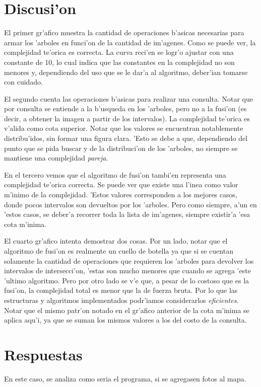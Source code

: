 \section{Discusi'on}
El primer gr'afico muestra la cantidad de operaciones b'asicas necesarias para armar los 'arboles en funci'on de la cantidad de im'agenes. Como se puede ver, la complejidad te'orica es correcta. La curva reci'en se logr'o ajustar con una constante de 10, lo cual indica que las constantes en la complejidad no son menores y, dependiendo del uso que se le dar'a al algoritmo, deber'ian tomarse con cuidado.

El segundo cuenta las operaciones b'asicas para realizar una consulta. Notar que por consulta se entiende a la b'usqueda en los 'arboles, pero no a la fusi'on (es decir, a obtener la imagen a partir de los intervalos). La complejidad te'orica es v'alida como cota superior. Notar que los valores se encuentran notablemente distribu'idos, sin formar una figura clara. 'Esto se debe a que, dependiendo del punto que se pida buscar y de la distribuci'on de los 'arboles, no siempre se mantiene una complejidad \emph{pareja}.

En el tercero vemos que el algoritmo de fusi'on tambi'en representa una complejidad te'orica correcta. Se puede ver que existe una l'inea como valor m'inimo de la complejidad. 'Estos valores corresponden a los mejores casos, donde pocos intervalos son devueltos por los 'arboles. Pero como siempre, a'un en 'estos casos, se deber'a recorrer toda la lista de im'agenes, siempre existir'a 'esa cota m'inima.

El cuarto gr'afico intenta demostrar dos cosas. Por un lado, notar que el algoritmo de fusi'on es realmente un cuello de botella ya que si se cuentan solamente la cantidad de operaciones que requieren los 'arboles para devolver los intervalos de intersecci'on, 'estas son mucho menores que cuando se agrega 'este 'ultimo algoritmo. Pero por otro lado se v'e que, a pesar de lo costoso que es la fusi'on, la complejidad total es menor que la de fuerza bruta. Por lo que las estructuras y algoritmos implementados podr'iamos considerarlos \emph{eficientes}. Notar que el mismo patr'on notado en el gr'afico anterior de la cota m'inima se aplica aqu'i, ya que se suman los mismos valores a los del costo de la consulta.

\section{Respuestas}
En este caso, se analiza como seria el programa, si se agregasen fotos al mapa.


